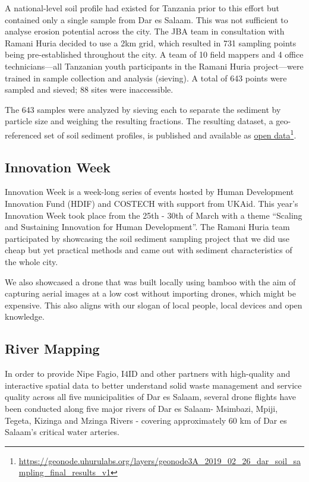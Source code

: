 \documentclass[a4paper,12pt,twoside]{article}
\begin{document}
\begin{multicols}{2}
A national-level soil profile had existed for Tanzania prior to this effort but contained only a single sample from Dar es Salaam. This was not sufficient to analyse erosion potential across the city. The JBA team in consultation with Ramani Huria decided to use a 2km grid, which resulted in 731 sampling points being pre-established throughout the city. A team of 10 field mappers and 4 office technicians—all Tanzanian youth participants in the Ramani Huria project—were trained in sample collection and analysis (sieving). A total of 643 points were sampled and sieved; 88 sites were inaccessible.


The 643 samples were analyzed by sieving each to separate the sediment by particle size and weighing the resulting fractions. The resulting dataset, a geo-referenced set of soil sediment profiles, is published and available as \href{https://geonode.uhurulabs.org/layers/geonode3A_2019_02_26_dar_soil_sampling_final_results_v1}{open data}\footnote{\url{https://geonode.uhurulabs.org/layers/geonode3A_2019_02_26_dar_soil_sampling_final_results_v1}}.

\subsection{Innovation Week}
Innovation Week is a week-long series of events hosted by Human Development Innovation Fund (HDIF) and COSTECH with support from UKAid. This year’s Innovation Week took place from the 25th - 30th of March with a theme “Scaling and Sustaining Innovation for Human Development”. The Ramani Huria team participated by showcasing the soil sediment sampling project that we did use cheap but yet practical methods and came out with sediment characteristics of the whole city.

We also showcased a drone that was built locally using bamboo with the aim of capturing aerial images at a low cost without importing drones, which might be expensive. This also aligns with our slogan of local people, local devices and open knowledge.

\subsection{River Mapping}
In order to provide Nipe Fagio, I4ID and other partners with high-quality and interactive spatial data to better understand solid waste management and service quality across all five municipalities of Dar es Salaam, several drone flights have been conducted along five major rivers of Dar es Salaam- Msimbazi, Mpiji, Tegeta, Kizinga and Mzinga Rivers - covering approximately 60 km of Dar es Salaam’s critical water arteries. 


\end{multicols}
\end{document}
